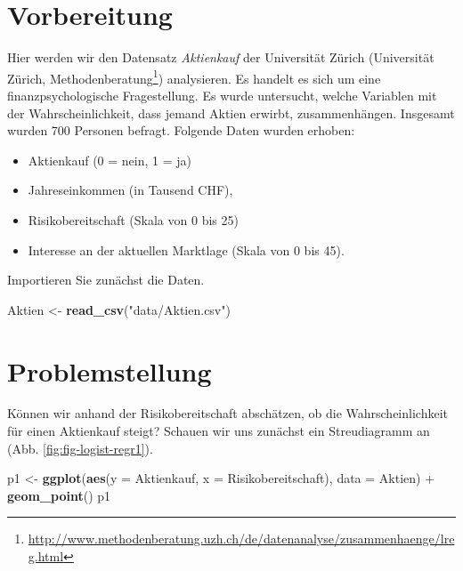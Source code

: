 \documentclass[12pt,ngerman,]{book}
\makeatletter
\newenvironment{Shaded}{\begin{snugshade}}{\end{snugshade}}
\newcommand{\KeywordTok}[1]{\textcolor[rgb]{0.13,0.29,0.53}{\textbf{{#1}}}}
\newcommand{\DataTypeTok}[1]{\textcolor[rgb]{0.13,0.29,0.53}{{#1}}}
\newcommand{\StringTok}[1]{\textcolor[rgb]{0.31,0.60,0.02}{{#1}}}
\newcommand{\NormalTok}[1]{{#1}}
\providecommand{\tightlist}{%
  \setlength{\itemsep}{0pt}\setlength{\parskip}{0pt}}
\let\rmarkdownfootnote\footnote%
\def\footnote{\protect\rmarkdownfootnote}
\renewcommand{\href}[2]{#2\footnote{\url{#1}}}
\newenvironment{kframe}{%
\medskip{}
\setlength{\fboxsep}{.8em}
 \def\at@end@of@kframe{}%
 \ifinner\ifhmode%
  \def\at@end@of@kframe{\end{minipage}}%
  \begin{minipage}{\columnwidth}%
 \fi\fi%
 \def\FrameCommand##1{\hskip\@totalleftmargin \hskip-\fboxsep
 \colorbox{shadecolor}{##1}\hskip-\fboxsep
     \hskip-\linewidth \hskip-\@totalleftmargin \hskip\columnwidth}%
 \MakeFramed {\advance\hsize-\width
   \@totalleftmargin\z@ \linewidth\hsize
   \@setminipage}}%
 {\par\unskip\endMakeFramed%
 \at@end@of@kframe}
\renewenvironment{Shaded}{\begin{kframe}}{\end{kframe}}
\makeatother
\begin{document}
\section{Vorbereitung}\label{vorbereitung}

Hier werden wir den Datensatz \emph{Aktienkauf} der Universität Zürich
(\href{http://www.methodenberatung.uzh.ch/de/datenanalyse/zusammenhaenge/lreg.html}{Universität
Zürich, Methodenberatung}) analysieren. Es handelt es sich um eine
finanzpsychologische Fragestellung. Es wurde untersucht, welche
Variablen mit der Wahrscheinlichkeit, dass jemand Aktien erwirbt,
zusammenhängen. Insgesamt wurden 700 Personen befragt. Folgende Daten
wurden erhoben:

\begin{itemize}
\tightlist
\item
  Aktienkauf (0 = nein, 1 = ja)
\item
  Jahreseinkommen (in Tausend CHF),
\item
  Risikobereitschaft (Skala von 0 bis 25)
\item
  Interesse an der aktuellen Marktlage (Skala von 0 bis 45).
\end{itemize}

Importieren Sie zunächst die Daten.

\begin{Shaded}
\begin{Highlighting}[]
\NormalTok{Aktien <-}\StringTok{ }\KeywordTok{read_csv}\NormalTok{(}\StringTok{"data/Aktien.csv"}\NormalTok{)}
\end{Highlighting}
\end{Shaded}

\section{Problemstellung}\label{problemstellung}

Können wir anhand der Risikobereitschaft abschätzen, ob die
Wahrscheinlichkeit für einen Aktienkauf steigt? Schauen wir uns zunächst
ein Streudiagramm an (Abb. \ref{fig:fig-logist-regr1}).

\begin{Shaded}
\begin{Highlighting}[]
\NormalTok{p1 <-}\StringTok{ }\KeywordTok{ggplot}\NormalTok{(}\KeywordTok{aes}\NormalTok{(}\DataTypeTok{y =} \NormalTok{Aktienkauf, }\DataTypeTok{x =} \NormalTok{Risikobereitschaft), }\DataTypeTok{data =} \NormalTok{Aktien) +}\StringTok{ }\KeywordTok{geom_point}\NormalTok{()}
\NormalTok{p1}
\end{Highlighting}
\end{Shaded}
\end{document}
